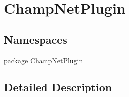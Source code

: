 \hypertarget{group__plugin}{\section{Champ\-Net\-Plugin}
\label{group__plugin}
}
\subsection*{Namespaces}
\begin{DoxyCompactItemize}
\item 
package \hyperlink{namespace_champ_net_plugin}{Champ\-Net\-Plugin}
\end{DoxyCompactItemize}


\subsection{Detailed Description}
